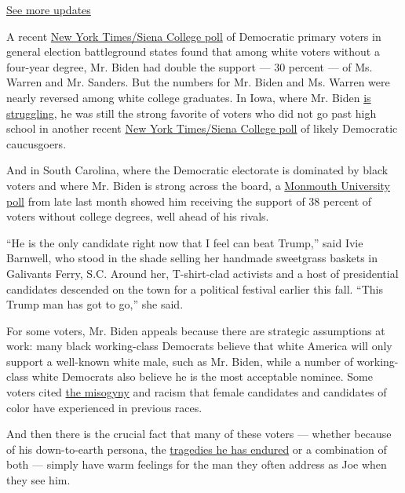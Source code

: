 \href{https://www.nytimes.com/2020/07/31/us/elections/biden-vs-trump.html?action=click\&pgtype=Article\&state=default\&region=MAIN_CONTENT_1\&context=storylines_live_updates}{See
more updates}

A recent
\href{https://www.nytimes.com/2019/11/08/us/politics/democrats-poll-moderates-battleground.html}{New
York Times/Siena College poll} of Democratic primary voters in general
election battleground states found that among white voters without a
four-year degree, Mr. Biden had double the support --- 30 percent --- of
Ms. Warren and Mr. Sanders. But the numbers for Mr. Biden and Ms. Warren
were nearly reversed among white college graduates. In Iowa, where Mr.
Biden
\href{https://www.nytimes.com/2019/11/01/us/politics/iowa-poll-warren-biden.html}{is
struggling}, he was still the strong favorite of voters who did not go
past high school in another recent
\href{https://www.nytimes.com/2019/11/01/us/politics/iowa-poll-warren-biden.html}{New
York Times/Siena College poll} of likely Democratic caucusgoers.

And in South Carolina, where the Democratic electorate is dominated by
black voters and where Mr. Biden is strong across the board, a
\href{https://www.monmouth.edu/polling-institute/documents/monmouthpoll_sc_102319.pdf/}{Monmouth
University poll} from late last month showed him receiving the support
of 38 percent of voters without college degrees, well ahead of his
rivals.

``He is the only candidate right now that I feel can beat Trump,'' said
Ivie Barnwell, who stood in the shade selling her handmade sweetgrass
baskets in Galivants Ferry, S.C. Around her, T-shirt-clad activists and
a host of presidential candidates descended on the town for a political
festival earlier this fall. ``This Trump man has got to go,'' she said.

For some voters, Mr. Biden appeals because there are strategic
assumptions at work: many black working-class Democrats believe that
white America will only support a well-known white male, such as Mr.
Biden, while a number of working-class white Democrats also believe he
is the most acceptable nominee. Some voters cited
\href{https://www.nytimes.com/2019/07/03/us/politics/women-presidential-candidates-2020.html}{the
misogyny} and racism that female candidates and candidates of color have
experienced in previous races.

And then there is the crucial fact that many of these voters --- whether
because of his down-to-earth persona, the
\href{https://www.nytimes.com/2019/05/30/us/politics/joe-biden-beau-biden-death.html}{tragedies
he has endured} or a combination of both --- simply have warm feelings
for the man they often address as Joe when they see him.

